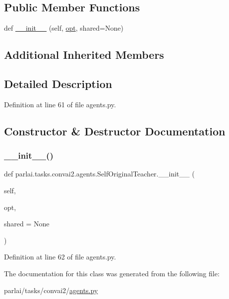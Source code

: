 \subsection*{Public Member Functions}
\begin{DoxyCompactItemize}
\item 
def \hyperlink{classparlai_1_1tasks_1_1convai2_1_1agents_1_1SelfOriginalTeacher_abcdf7f07251be2d5f52cd095c50d2fac}{\+\_\+\+\_\+init\+\_\+\+\_\+} (self, \hyperlink{classparlai_1_1core_1_1teachers_1_1FbDialogTeacher_af7a9ec497b9cd0292d7b8fa220da7c28}{opt}, shared=None)
\end{DoxyCompactItemize}
\subsection*{Additional Inherited Members}


\subsection{Detailed Description}


Definition at line 61 of file agents.\+py.



\subsection{Constructor \& Destructor Documentation}
\mbox{\label{classparlai_1_1tasks_1_1convai2_1_1agents_1_1SelfOriginalTeacher_abcdf7f07251be2d5f52cd095c50d2fac}} 
\subsubsection{\texorpdfstring{\+\_\+\+\_\+init\+\_\+\+\_\+()}{\_\_init\_\_()}}
{\footnotesize\ttfamily def parlai.\+tasks.\+convai2.\+agents.\+Self\+Original\+Teacher.\+\_\+\+\_\+init\+\_\+\+\_\+ (\begin{DoxyParamCaption}\item[{}]{self,  }\item[{}]{opt,  }\item[{}]{shared = {\ttfamily None} }\end{DoxyParamCaption})}



Definition at line 62 of file agents.\+py.



The documentation for this class was generated from the following file\+:\begin{DoxyCompactItemize}
\item 
parlai/tasks/convai2/\hyperlink{parlai_2tasks_2convai2_2agents_8py}{agents.\+py}\end{DoxyCompactItemize}
